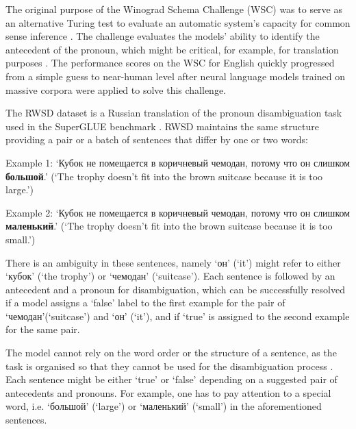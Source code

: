 \documentclass[11pt]{article}
\begin{document}
The original purpose of the Winograd Schema Challenge (WSC) was to serve as an alternative Turing test to evaluate an automatic system’s capacity for common sense inference \cite{10.5555/3031843.3031909}. The challenge evaluates the models' ability to identify the antecedent of the pronoun, which might be critical, for example, for translation purposes \cite{davis2016winograd}. The performance scores on the WSC for English quickly progressed from a simple guess to near-human level \cite{emami-etal-2020-analysis} after neural language models trained on massive
corpora were applied to solve this challenge.

The RWSD dataset is a Russian translation of the pronoun disambiguation task used in the SuperGLUE benchmark \cite{Morgenstern_Davis_Ortiz_2016}. RWSD maintains the same structure providing a pair or a batch of sentences that differ by one or two words:

\begin{flushleft}
Example 1: \foreignlanguage{russian}{`Кубок не помещается в коричневый чемодан, потому что он слишком \textbf{большой}.'} (`The trophy doesn't fit into the brown suitcase because it is too large.')

Example 2: \foreignlanguage{russian}{`Кубок не помещается в коричневый чемодан, потому что он слишком \textbf{маленький}.'} (`The trophy doesn't fit into the brown suitcase because it is too small.')
\end{flushleft}

There is an ambiguity in these sentences, namely \foreignlanguage{russian}{`он'} (`it') might refer to either \foreignlanguage{russian}{`кубок'} (`the trophy') or \foreignlanguage{russian}{`чемодан'} (`suitcase'). Each sentence is followed by an antecedent and a pronoun for disambiguation, which can be successfully resolved if a model assigns a `false' label to the first example for the pair of \foreignlanguage{russian}{`чемодан'}(`suitcase') and \foreignlanguage{russian}{`он'} (`it'), and if `true' is assigned to the second example for the same pair. 

The model cannot rely on the word order or the structure of a sentence, as the task is organised so that they cannot be used for the disambiguation process \cite{Morgenstern_Davis_Ortiz_2016}. Each sentence might be either `true' or `false' depending on a suggested pair of antecedents and pronouns. For example, one has to pay attention to a special word, i.e.  \foreignlanguage{russian}{`большой'} (`large') or \foreignlanguage{russian}{`маленький'} (`small') in the aforementioned sentences.
\end{document}

